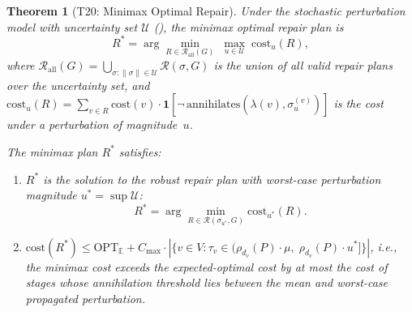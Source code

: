 \documentclass[11pt,a4paper]{article}
\newtheorem{theorem}{Theorem}[section]
\theoremstyle{definition}
\newcommand{\ann}{\mathrm{annihilates}}
\newcommand{\cost}{\mathrm{cost}}
\newcommand{\OPT}{\mathrm{OPT}}
\newcommand{\bbE}{\mathbb{E}}
\newcommand{\cR}{\mathcal{R}}
\begin{document}
\begin{theorem}[T20: Minimax Optimal Repair]\label{thm:minimax}
Under the stochastic perturbation model with uncertainty set $\mathcal{U}$
(), the minimax optimal repair plan is
\[
  R^* = \arg\min_{R \in \cR_{\mathrm{all}}(G)}\;
    \max_{u \in \mathcal{U}}\;
    \cost_u(R),
\]
where $\cR_{\mathrm{all}}(G) = \bigcup_{\sigma : \|\sigma\| \in \mathcal{U}}
\cR(\sigma, G)$ is the union of all valid repair plans over the uncertainty
set, and $\cost_u(R) = \sum_{v \in R} \cost(v) \cdot
\mathbf{1}[\lnot\,\ann(\lambda(v), \sigma_u^{(v)})]$ is the cost under a
perturbation of magnitude~$u$.

The minimax plan $R^*$ satisfies:
\begin{enumerate}[label=(\alph*)]
  \item $R^*$ is the solution to the robust repair plan with worst-case
    perturbation magnitude $u^* = \sup \mathcal{U}$:
    \begin{equation}\label{eq:minimax-solution}
      R^* = \arg\min_{R \in \cR(\sigma_{u^*}, G)} \cost_{u^*}(R).
    \end{equation}
  \item $\cost(R^*) \leq \OPT_{\bbE} + C_{\max} \cdot
    |\{v \in V : \tau_v \in (\rho_{d_v}(P) \cdot \mu,\;
    \rho_{d_v}(P) \cdot u^*]\}|$,
    i.e., the minimax cost exceeds the expected-optimal cost by at most the
    cost of stages whose annihilation threshold lies between the mean and
    worst-case propagated perturbation.
\end{enumerate}
\end{theorem}
\end{document}
